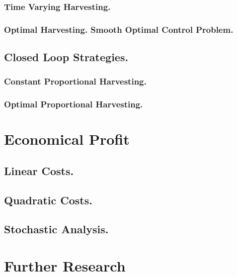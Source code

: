 \documentclass[twoside,colorback,accentcolor=tud4c,11pt]{tudreport}
\begin{document}
		\subsection{Time Varying Harvesting.}
		
		\subsection{Optimal Harvesting. Smooth Optimal Control Problem.}
		
	\section{Closed Loop Strategies.}
		
		\subsection{Constant Proportional Harvesting.}
		
		\subsection{Optimal Proportional Harvesting.}
		
\chapter{Economical Profit}\label{chap: Economical Profit}
	
	\section{Linear Costs.}
	
	\section{Quadratic Costs.}
	
	\section{Stochastic Analysis.}
	
\chapter{Further Research}\label{chap: Further Enhancements}
\end{document}
